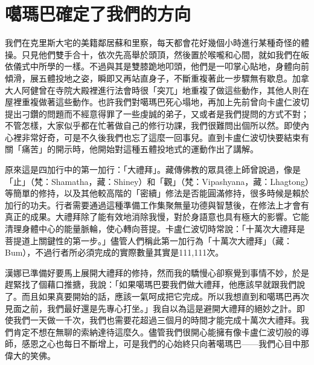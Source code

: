 \chapter{噶瑪巴確定了我們的方向}

我們在克里斯大宅的美籍鄰居蘇和里察，每天都會花好幾個小時進行某種奇怪的體操。只見他們雙手合十，依次先高舉於頭頂，然後置於喉嚨和心間，就如我們在皈依儀式中所學的一樣。不過與其是雙膝跪地叩頭，他們是一叩掌心貼地，身體向前傾滑，展五體投地之姿，瞬即又再站直身子，不斷重複著此一步驟無有歇息。加拿大人阿健曾在寺院大殿裡進行法會時很「突兀」地重複了做這些動作，其他人則在屋裡重複做著這些動作。也許我們對噶瑪巴死心塌地，再加上先前曾向卡盧仁波切提出刁鑽的問題而不經意得罪了一些虔誠的弟子，又或者是我們提問的方式不對；不管怎樣，大家似乎都在忙著做自己的修行功課，我們很難問出個所以然。即使內心裡非常好奇，可是不久後我們也忘了這麼一回事兒。直到卡盧仁波切快要結束有關「痛苦」的開示時，他開始對這種五體投地式的運動作出了講解。

原來這是四加行中的第一加行：「大禮拜」。藏傳佛教的眾具德上師曾說過，像是「止」（梵：Shamatha，藏：Shiney）和「觀」（梵：Vipashyana，藏：Lhagtong）等簡單的修持，以及其他較高階的「密續」修法是否能圓滿修持，很多時候是賴於加行的功夫。行者需要通過這種準備工作集聚無量功德與智慧後，在修法上才會有真正的成果。大禮拜除了能有效地消除我慢，對於身語意也具有極大的影響。它能清理身體中心的能量脈輪，使心轉向菩提。卡盧仁波切時常說：「十萬次大禮拜是菩提道上關鍵性的第一步。」儘管人們稱此第一加行為「十萬次大禮拜」（藏：Bum），不過行者所必須完成的實際數量其實是111,111次。

漢娜已準備好要馬上展開大禮拜的修持，然而我的驕慢心卻察覺到事情不妙，於是趕緊找了個藉口推搪，我說：「如果噶瑪巴要我們做大禮拜，他應該早就跟我們說了。而且如果真要開始的話，應該一氣呵成把它完成。所以我想直到和噶瑪巴再次見面之前，我們最好還是先專心打坐。」我自以為這是避開大禮拜的絕妙之計。即使我們一天做一千次，我們也需要花超過三個月的時間才能完成十萬次大禮拜。我們肯定不想在無聊的索納達待這麼久。儘管我們很開心能擁有像卡盧仁波切般的導師，感恩之心也每日不斷增上，可是我們的心始終只向著噶瑪巴——我們心目中那偉大的笑佛。

